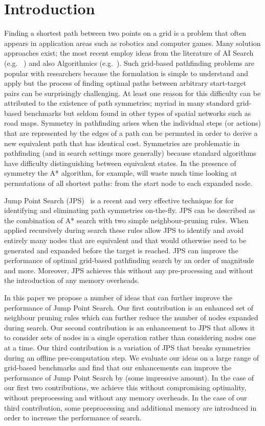 \section{Introduction}
\label{sec::introduction}
Finding a shortest path between two points on a grid is a problem that often 
appears in application areas such as robotics and computer games. 
Many solution approaches exist; the most recent employ ideas from the
literature of AI Search (e.g. ~\cite{pochter10,goldenberg10,yap11,urasKH13})
and also Algorithmics (e.g.~\cite{storandt13,antsfeld12}). Such grid-based
pathfinding problems are popular with researchers because the formulation is
simple to understand and apply but the process of finding optimal paths
between arbitrary start-target pairs can be surprisingly challenging. At least
one reason for this difficulty can be attributed to the existence of path
symmetries; myriad in many standard grid-based benchmarks but seldom
found in other types of spatial networks such as road maps.  Symmetry in
pathfinding arises when the individual steps (or actions) that are represented
by the edges of a path can be permuted in order to derive a new equivalent
path that has identical cost.  Symmetries are problematic in pathfinding (and
in search settings more generally) because standard algorithms have difficulty
distinguishing between equivalent states.  In the presence of symmetry the A*
algorithm, for example, will waste much time looking at permutations of all
shortest paths: from the start node to each expanded node.

Jump Point Search (JPS)~\cite{harabor11b} is a recent and very effective 
technique for for identifying and eliminating path symmetries on-the-fly. 
JPS can be described as the combination of A* search with two simple 
neighbour-pruning rules. When applied recursively during search these
rules allow JPS to identify and avoid entirely many nodes that are 
equivalent and that would otherwise need to be generated
and expanded before the target is reached.
JPS can improve the performance of optimal grid-based pathfinding search 
by an order of magnitude and more. Moreover, JPS achieves this without 
any pre-processing and without the introduction of any memory overheads.

In this paper we propose a number of ideas that can further improve the
performance of Jump Point Search. Our first contribution is an enhanced
set of neighbour pruning rules which can further reduce the number of 
nodes expanded during search. Our second contribution is an enhancement
to JPS that allows it to consider sets of nodes in a single operation 
rather than considering nodes one at a time.
Our third contribution is a variation of JPS that breaks symmetries
during an offline pre-computation step.
We evaluate our ideas on a large range of grid-based benchmarks and
find that our enhancements can improve the performance of Jump Point Search
by (some impressive amount). In the case of our first
two contributions, we achieve this without compromising optimality, without
preprocessing and without any memory overheads. In the case of our third
contribution, some preprocessing and additional memory are introduced 
in order to increase the performance of search.

